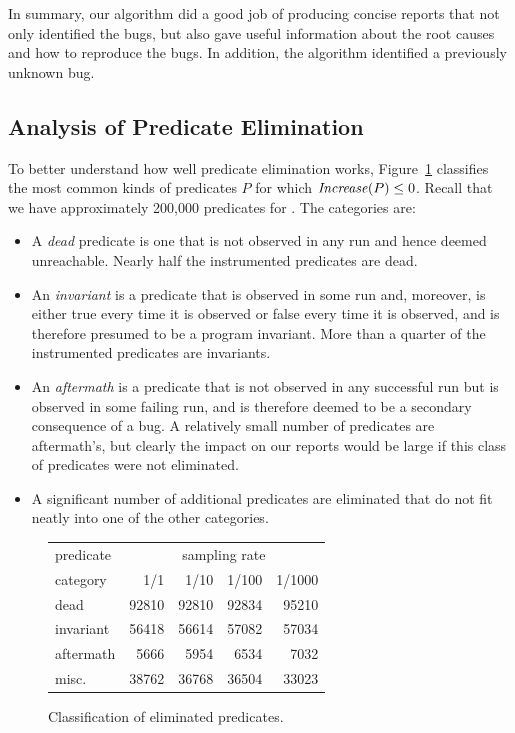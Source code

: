 In summary, our algorithm did a good job of producing concise reports that not
only identified the bugs, but also gave useful information about the root causes and
how to reproduce the bugs.  In addition, the algorithm identified a previously unknown
bug.

\subsection{Analysis of Predicate Elimination}

To better understand how well predicate elimination works,
Figure~\ref{predelim} classifies the most common kinds of predicates
$P$ for which $\mbox{\textit{Increase}}(P) \leq 0$.  Recall that we have
approximately 200,000 predicates for \moss.  The categories are:

\begin{itemize}
\item  A {\it dead} predicate is one that is not observed in any run and hence
deemed unreachable.  Nearly half the instrumented predicates are dead.

\item An {\it invariant} is a predicate that is observed in some run and, moreover,
is either true every time it is observed or false every time it is observed,
and is therefore presumed to be a program invariant.  More than a quarter of
the instrumented predicates are invariants.

\item An {\it aftermath} is a predicate that is not observed in any successful run but
is observed in some failing run, and is therefore deemed to be a secondary consequence
of a bug.  A relatively small number of predicates are aftermath's, but clearly
the impact on our reports would be large if this class of predicates were not eliminated.

\item A significant number of additional predicates are eliminated that do not fit
neatly into one of the other categories.

\end{itemize}

\begin{figure}[h]
\begin{center}
\begin{tabular}{|l|r|r|r|r|}
\hline
predicate &  \multicolumn{4}{c|}{sampling rate} \\
\cline{2-5}
category  &  1/1 & 1/10 & 1/100 & 1/1000 \\
\hline
\hline
dead      &  92810 & 92810 & 92834 & 95210 \\
\hline
invariant &  56418 & 56614 & 57082 & 57034 \\
\hline
aftermath &  5666  & 5954  & 6534  & 7032 \\
\hline
misc.     &  38762 & 36768 & 36504 & 33023 \\
\hline
\end{tabular}
\caption{Classification of eliminated predicates.}
\label{predelim}
\end{center}
\end{figure}

